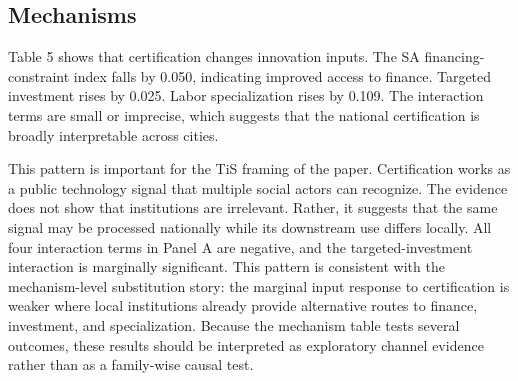 \documentclass[12pt]{article}
\begin{document}
\subsection{Mechanisms}

Table 5 shows that certification changes innovation inputs. The SA financing-constraint index falls by 0.050, indicating improved access to finance. Targeted investment rises by 0.025. Labor specialization rises by 0.109. The interaction terms are small or imprecise, which suggests that the national certification is broadly interpretable across cities.

This pattern is important for the TiS framing of the paper. Certification works as a public technology signal that multiple social actors can recognize. The evidence does not show that institutions are irrelevant. Rather, it suggests that the same signal may be processed nationally while its downstream use differs locally. All four interaction terms in Panel A are negative, and the targeted-investment interaction is marginally significant. This pattern is consistent with the mechanism-level substitution story: the marginal input response to certification is weaker where local institutions already provide alternative routes to finance, investment, and specialization. Because the mechanism table tests several outcomes, these results should be interpreted as exploratory channel evidence rather than as a family-wise causal test.
\end{document}
